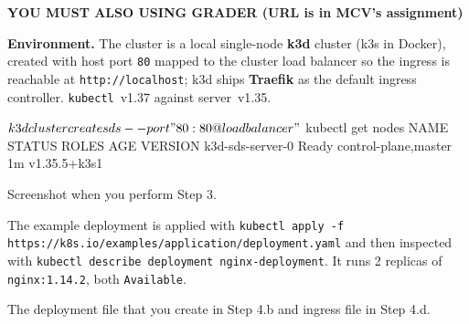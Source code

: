 \documentclass[a4paper, 10pt]{article}
\begin{document}
\begin{center}
	\par\noindent\textbf{\color{red} YOU MUST ALSO USING GRADER (URL is in MCV's assignment)}
\end{center}

\newpage

\noindent\textbf{Environment.}
The cluster is a local single-node \textbf{k3d} cluster (k3s in Docker), created with
host port \texttt{80} mapped to the cluster load balancer so the ingress is reachable
at \texttt{http://localhost}; k3d ships \textbf{Traefik} as the default ingress
controller. \texttt{kubectl}~v1.37 against server~v1.35.
\begin{codingbox*}[language=bash]
$ k3d cluster create sds --port "80:80@loadbalancer"
$ kubectl get nodes
NAME               STATUS   ROLES                  AGE   VERSION
k3d-sds-server-0   Ready    control-plane,master   1m    v1.35.5+k3s1
\end{codingbox*}

\bigskip

\begin{problem}
Screenshot when you perform Step 3.
\end{problem}

\begin{solution}
	The example deployment is applied with
	\texttt{kubectl apply -f https://k8s.io/examples/application/deployment.yaml}
	and then inspected with \texttt{kubectl describe deployment nginx-deployment}.
	It runs 2 replicas of \texttt{nginx:1.14.2}, both \texttt{Available}.

\end{solution}

\begin{problem}
The deployment file that you create in Step 4.b and ingress file in Step 4.d.
\end{problem}
\end{document}
